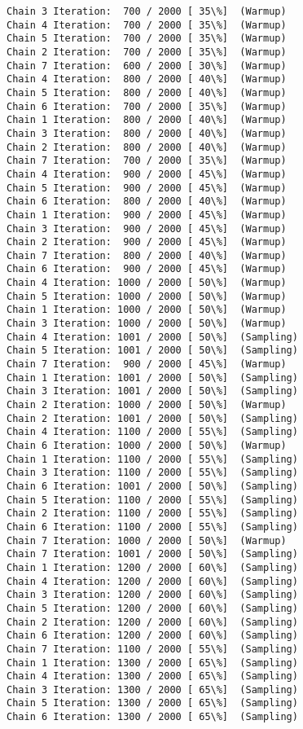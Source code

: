 \documentclass[11pt]{article}
\begin{document}
\begin{Verbatim}[commandchars=\\\{\}]
Chain 3 Iteration:  700 / 2000 [ 35\%]  (Warmup)
Chain 4 Iteration:  700 / 2000 [ 35\%]  (Warmup)
Chain 5 Iteration:  700 / 2000 [ 35\%]  (Warmup)
Chain 2 Iteration:  700 / 2000 [ 35\%]  (Warmup)
Chain 7 Iteration:  600 / 2000 [ 30\%]  (Warmup)
Chain 4 Iteration:  800 / 2000 [ 40\%]  (Warmup)
Chain 5 Iteration:  800 / 2000 [ 40\%]  (Warmup)
Chain 6 Iteration:  700 / 2000 [ 35\%]  (Warmup)
Chain 1 Iteration:  800 / 2000 [ 40\%]  (Warmup)
Chain 3 Iteration:  800 / 2000 [ 40\%]  (Warmup)
Chain 2 Iteration:  800 / 2000 [ 40\%]  (Warmup)
Chain 7 Iteration:  700 / 2000 [ 35\%]  (Warmup)
Chain 4 Iteration:  900 / 2000 [ 45\%]  (Warmup)
Chain 5 Iteration:  900 / 2000 [ 45\%]  (Warmup)
Chain 6 Iteration:  800 / 2000 [ 40\%]  (Warmup)
Chain 1 Iteration:  900 / 2000 [ 45\%]  (Warmup)
Chain 3 Iteration:  900 / 2000 [ 45\%]  (Warmup)
Chain 2 Iteration:  900 / 2000 [ 45\%]  (Warmup)
Chain 7 Iteration:  800 / 2000 [ 40\%]  (Warmup)
Chain 6 Iteration:  900 / 2000 [ 45\%]  (Warmup)
Chain 4 Iteration: 1000 / 2000 [ 50\%]  (Warmup)
Chain 5 Iteration: 1000 / 2000 [ 50\%]  (Warmup)
Chain 1 Iteration: 1000 / 2000 [ 50\%]  (Warmup)
Chain 3 Iteration: 1000 / 2000 [ 50\%]  (Warmup)
Chain 4 Iteration: 1001 / 2000 [ 50\%]  (Sampling)
Chain 5 Iteration: 1001 / 2000 [ 50\%]  (Sampling)
Chain 7 Iteration:  900 / 2000 [ 45\%]  (Warmup)
Chain 1 Iteration: 1001 / 2000 [ 50\%]  (Sampling)
Chain 3 Iteration: 1001 / 2000 [ 50\%]  (Sampling)
Chain 2 Iteration: 1000 / 2000 [ 50\%]  (Warmup)
Chain 2 Iteration: 1001 / 2000 [ 50\%]  (Sampling)
Chain 4 Iteration: 1100 / 2000 [ 55\%]  (Sampling)
Chain 6 Iteration: 1000 / 2000 [ 50\%]  (Warmup)
Chain 1 Iteration: 1100 / 2000 [ 55\%]  (Sampling)
Chain 3 Iteration: 1100 / 2000 [ 55\%]  (Sampling)
Chain 6 Iteration: 1001 / 2000 [ 50\%]  (Sampling)
Chain 5 Iteration: 1100 / 2000 [ 55\%]  (Sampling)
Chain 2 Iteration: 1100 / 2000 [ 55\%]  (Sampling)
Chain 6 Iteration: 1100 / 2000 [ 55\%]  (Sampling)
Chain 7 Iteration: 1000 / 2000 [ 50\%]  (Warmup)
Chain 7 Iteration: 1001 / 2000 [ 50\%]  (Sampling)
Chain 1 Iteration: 1200 / 2000 [ 60\%]  (Sampling)
Chain 4 Iteration: 1200 / 2000 [ 60\%]  (Sampling)
Chain 3 Iteration: 1200 / 2000 [ 60\%]  (Sampling)
Chain 5 Iteration: 1200 / 2000 [ 60\%]  (Sampling)
Chain 2 Iteration: 1200 / 2000 [ 60\%]  (Sampling)
Chain 6 Iteration: 1200 / 2000 [ 60\%]  (Sampling)
Chain 7 Iteration: 1100 / 2000 [ 55\%]  (Sampling)
Chain 1 Iteration: 1300 / 2000 [ 65\%]  (Sampling)
Chain 4 Iteration: 1300 / 2000 [ 65\%]  (Sampling)
Chain 3 Iteration: 1300 / 2000 [ 65\%]  (Sampling)
Chain 5 Iteration: 1300 / 2000 [ 65\%]  (Sampling)
Chain 6 Iteration: 1300 / 2000 [ 65\%]  (Sampling)

\end{Verbatim}
\end{document}
